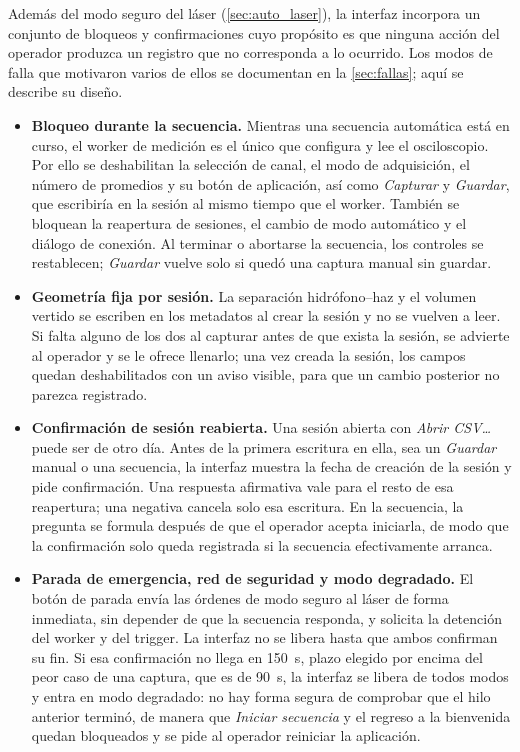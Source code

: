 Además del modo seguro del láser (\cref{sec:auto_laser}), la interfaz
incorpora un conjunto de bloqueos y confirmaciones cuyo propósito es
que ninguna acción del operador produzca un registro que no
corresponda a lo ocurrido. Los modos de falla que motivaron varios de
ellos se documentan en la \cref{sec:fallas}; aquí se describe su
diseño.

\begin{itemize}
  \item \textbf{Bloqueo durante la secuencia.} Mientras una secuencia
    automática está en curso, el worker de medición es el único que
    configura y lee el osciloscopio. Por ello se deshabilitan la
    selección de canal, el modo de adquisición, el número de promedios
    y su botón de aplicación, así como \textit{Capturar} y
    \textit{Guardar}, que escribiría en la sesión al mismo tiempo que
    el worker. También se bloquean la reapertura de sesiones, el
    cambio de modo automático y el diálogo de conexión. Al terminar o
    abortarse la secuencia, los controles se restablecen;
    \textit{Guardar} vuelve solo si quedó una captura manual sin
    guardar.

  \item \textbf{Geometría fija por sesión.} La separación
    hidrófono--haz y el volumen vertido se escriben en los metadatos
    al crear la sesión y no se vuelven a leer. Si falta alguno de los
    dos al capturar antes de que exista la sesión, se advierte al
    operador y se le ofrece llenarlo; una vez creada la sesión, los
    campos quedan deshabilitados con un aviso visible, para que un
    cambio posterior no parezca registrado.

  \item \textbf{Confirmación de sesión reabierta.} Una sesión abierta
    con \textit{Abrir CSV\ldots} puede ser de otro día. Antes de la
    primera escritura en ella, sea un \textit{Guardar} manual o una
    secuencia, la interfaz muestra la fecha de creación de la sesión y
    pide confirmación. Una respuesta afirmativa vale para el resto de
    esa reapertura; una negativa cancela solo esa escritura. En la
    secuencia, la pregunta se formula después de que el operador
    acepta iniciarla, de modo que la confirmación solo queda registrada
    si la secuencia efectivamente arranca.

  \item \textbf{Parada de emergencia, red de seguridad y modo
    degradado.} El botón de parada envía las órdenes de modo seguro al
    láser de forma inmediata, sin depender de que la secuencia
    responda, y solicita la detención del worker y del trigger. La
    interfaz no se libera hasta que ambos confirman su fin. Si esa
    confirmación no llega en \SI{150}{\second}, plazo elegido por
    encima del peor caso de una captura, que es de \SI{90}{\second},
    la interfaz se libera de todos modos y entra en modo degradado: no
    hay forma segura de comprobar que el hilo anterior terminó, de
    manera que \textit{Iniciar secuencia} y el regreso a la bienvenida
    quedan bloqueados y se pide al operador reiniciar la aplicación.


\end{itemize}
